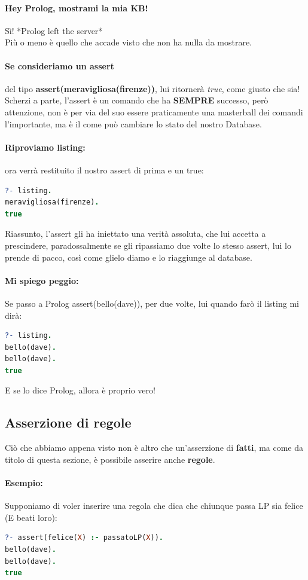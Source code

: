 \documentclass[12pt, a4paper, openany, oneside]{book}
\begin{document}
\paragraph{Hey Prolog, mostrami la mia KB! }Sì! *Prolog left the server*\\
Più o meno è quello che accade visto che non ha nulla da mostrare.
\paragraph{Se consideriamo un assert} del tipo 
\textbf{assert(meravigliosa(firenze))}, lui ritornerà \textit{true}, come giusto
che sia! Scherzi a parte, l'assert è un comando che ha \textbf{SEMPRE} successo,
però attenzione, non è per via del suo essere praticamente una masterball dei
comandi l'importante, ma è il come può cambiare lo stato del nostro Database.
\paragraph{Riproviamo listing: } ora verrà restituito il nostro assert di prima
e un true:
\begin{lstlisting}[language=Prolog] 
?- listing.
meravigliosa(firenze).
true
\end{lstlisting} 
Riassunto, l'assert gli ha iniettato una verità assoluta, che lui accetta a 
prescindere, paradossalmente se gli ripassiamo due volte lo stesso assert, lui 
lo prende di pacco, così come glielo diamo e lo riaggiunge al database.
\paragraph{Mi spiego peggio: } Se passo a Prolog assert(bello(dave)), per due 
volte, lui quando farò il listing mi dirà:
\begin{lstlisting}[language=Prolog] 
?- listing.
bello(dave).
bello(dave).
true
\end{lstlisting} 
E se lo dice Prolog, allora è proprio vero!
\subsection{Asserzione di regole}
Ciò che abbiamo appena visto non è altro che un'asserzione di \textbf{fatti}, ma
come da titolo di questa sezione, è possibile asserire anche \textbf{regole}.
\paragraph{Esempio: } Supponiamo di voler inserire una regola che dica che 
chiunque passa LP sia felice (E beati loro):
\begin{lstlisting}[language=Prolog] 
?- assert(felice(X) :- passatoLP(X)).
bello(dave).
bello(dave).
true
\end{lstlisting} 
\end{document}
